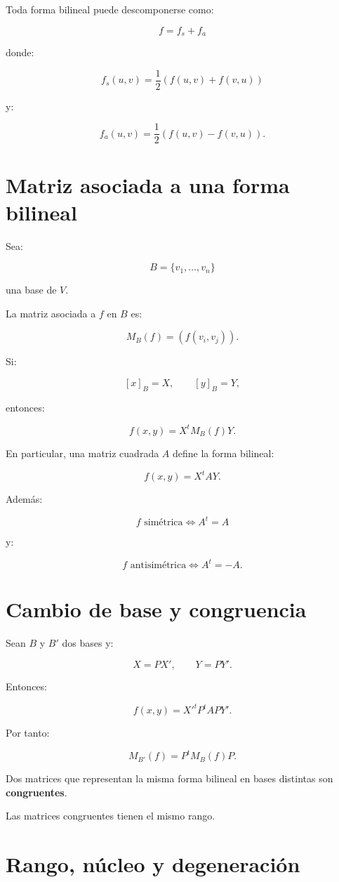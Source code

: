 \documentclass[11pt,a4paper]{article}
\begin{document}
Toda forma bilineal puede descomponerse como:

\[
\boxed{
f=f_s+f_a
}
\]

donde:

\[
\boxed{
f_s(u,v)=\frac12\left(f(u,v)+f(v,u)\right)
}
\]

y:

\[
\boxed{
f_a(u,v)=\frac12\left(f(u,v)-f(v,u)\right).
}
\]

\section{Matriz asociada a una forma bilineal}

Sea:

\[
B=\{v_1,\ldots,v_n\}
\]

una base de $V$.

La matriz asociada a $f$ en $B$ es:

\[
\boxed{
M_B(f)=\left(f(v_i,v_j)\right).
}
\]

Si:

\[
[x]_B=X,
\qquad
[y]_B=Y,
\]

entonces:

\[
\boxed{
f(x,y)=X^tM_B(f)Y.
}
\]

En particular, una matriz cuadrada $A$ define la forma bilineal:

\[
\boxed{
f(x,y)=X^tAY.
}
\]

Además:

\[
f\text{ simétrica}
\iff
A^t=A
\]

y:

\[
f\text{ antisimétrica}
\iff
A^t=-A.
\]

\section{Cambio de base y congruencia}

Sean $B$ y $B'$ dos bases y:

\[
X=PX',
\qquad
Y=PY'.
\]

Entonces:

\[
f(x,y)
=
X'^tP^tAPY'.
\]

Por tanto:

\[
\boxed{
M_{B'}(f)=P^tM_B(f)P.
}
\]

Dos matrices que representan la misma forma bilineal en bases distintas son \textbf{congruentes}.

Las matrices congruentes tienen el mismo rango.

\section{Rango, núcleo y degeneración}
\end{document}
